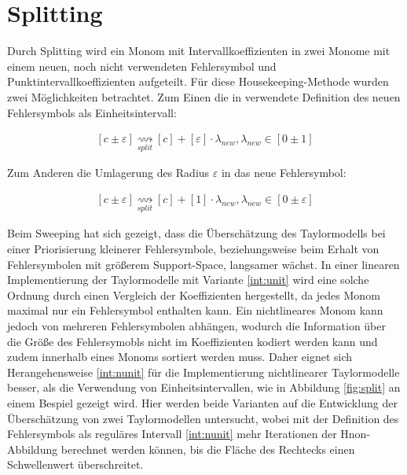  
 
 \section{Splitting}
 Durch Splitting wird ein Monom mit Intervallkoeffizienten in zwei Monome mit einem neuen, noch nicht verwendeten Fehlersymbol und Punktintervallkoeffizienten aufgeteilt. Für diese Housekeeping-Methode wurden zwei Möglichkeiten betrachtet. Zum Einen die in \cite{DBLP:conf/macis/BrausseKM15} verwendete Definition des neuen Fehlersymbols als Einheitsintervall:
 
\begin{align}
\label{int:unit}
 [c \pm \varepsilon]  \underset{split}{\rightsquigarrow} [c] + [\varepsilon] \cdot \lambda_{new}, \lambda_{new} \in [0 \pm 1]
\end{align}

Zum Anderen die Umlagerung des Radius $\varepsilon$ in das neue Fehlersymbol:

\begin{align}
\label{int:nunit}
 [c \pm \varepsilon]  \underset{split}{\rightsquigarrow} [c] + [1] \cdot \lambda_{new}, \lambda_{new} \in [0 \pm \varepsilon]
\end{align}
 
Beim Sweeping hat sich gezeigt, dass die Überschätzung des Taylormodells bei einer Priorisierung kleinerer Fehlersymbole, beziehungsweise beim Erhalt von Fehlersymbolen mit größerem Support-Space, langsamer wächst. In einer linearen Implementierung der Taylormodelle mit Variante \ref{int:unit} wird eine solche Ordnung durch einen Vergleich der Koeffizienten hergestellt, da jedes Monom maximal nur ein Fehlersymbol enthalten kann. Ein nichtlineares Monom kann jedoch von mehreren Fehlersymbolen abhängen, wodurch die Information über die Größe des Fehlersymobls nicht im Koeffizienten kodiert werden kann und zudem innerhalb eines Monoms sortiert werden muss. Daher eignet sich Herangehensweise \ref{int:nunit} für die Implementierung nichtlinearer Taylormodelle besser, als die Verwendung von Einheitsintervallen, wie in Abbildung \ref{fig:split} an einem Bespiel gezeigt wird. Hier werden beide Varianten auf die Entwicklung der Überschätzung von zwei Taylormodellen untersucht, wobei mit der Definition des Fehlersymbols als reguläres Intervall \ref{int:nunit} mehr Iterationen der H\e non-Abbildung berechnet werden können, bis die Fläche des Rechtecks einen Schwellenwert überschreitet.
 
 
